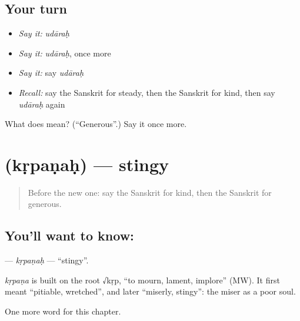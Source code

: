 \subsection*{Your turn}
\begin{itemize}
\raggedright
  \item \emph{Say it:} \emph{udāraḥ}
  \item \emph{Say it:} \emph{udāraḥ}, once more
  \item \emph{Say it:} say \emph{udāraḥ}
  \item \emph{Recall:} say the Sanskrit for steady, then the Sanskrit for kind, then say \emph{udāraḥ} again
\end{itemize}

\begin{tcolorbox}[breakable,colback=teal!4,colframe=teal!35!black,title={Before you move on}]
What does  mean? (\textquotedblleft{}Generous\textquotedblright{}.) Say it once more.
\end{tcolorbox}
\section[\texorpdfstring{\sk{कृपणः} (kṛpaṇaḥ)}{कृपणः (kṛpaṇaḥ)}]{ (kṛpaṇaḥ) — stingy}

\label{lesson:SA-C187-krpanah}



\begin{quote}
Before the new one: say the Sanskrit for kind, then the Sanskrit for generous.
\end{quote}

\subsection*{You'll want to know: }
\textbf{} — \emph{kṛpaṇaḥ} — \textquotedblleft{}stingy\textquotedblright{}.

\begin{cousinweb}
\emph{kṛpaṇa} is built on the root √kṛp, \textquotedblleft{}to mourn, lament, implore\textquotedblright{} (MW). It first meant \textquotedblleft{}pitiable, wretched\textquotedblright{}, and later \textquotedblleft{}miserly, stingy\textquotedblright{}: the miser as a poor soul.
\end{cousinweb}

\begin{grammarlens}[title={What you've built}]
One more word for this chapter.
\end{grammarlens}

